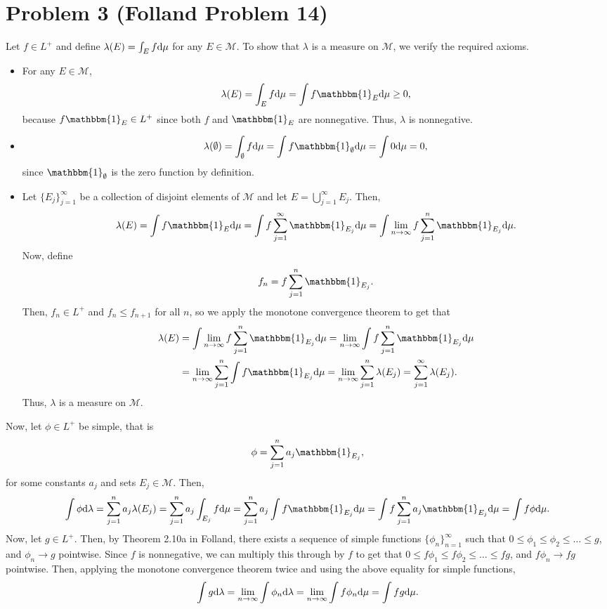 \documentclass{article}
\begin{document}
\section{Problem 3 (Folland Problem 14)}
Let $f\in L^+$ and define $\lambda(E)=\int_Ef\mathrm{d}\mu$ for any $E\in\mathcal M$. To show that $\lambda$ is a measure on $\mathcal M$, we verify the required axioms. 
\begin{itemize}
	\item For any $E\in\mathcal M$, 
	\[
	\lambda(E)=\int_Ef\df\mu=\int f\mathbbm{1}_E\df\mu\geq0,
	\]
	because $f\mathbbm{1}_E\in L^+$ since both $f$ and $\mathbbm{1}_E$ are nonnegative. Thus, $\lambda$ is nonnegative.
	\item 
	\[
	\lambda(\emptyset)=\int_\emptyset f\df\mu=\int f\mathbbm{1}_\emptyset\df\mu=\int0\df\mu=0,
	\]
	since $\mathbbm{1}_\emptyset$ is the zero function by definition.
	\item Let $\{E_j\}_{j=1}^\infty$ be a collection of disjoint elements of $\mathcal M$ and let $E=\bigcup_{j=1}^\infty E_j$. Then,
	\[
	\lambda(E)=\int f\mathbbm{1}_E\df\mu=\int f\sum_{j=1}^{\infty}\mathbbm{1}_{E_j}\df\mu=\int\lim_{n\to\infty} f\sum_{j=1}^{n}\mathbbm{1}_{E_j}\df\mu.
	\]
	Now, define 
	\[
	f_n=f\sum_{j=1}^{n}\mathbbm{1}_{E_j}.
	\]
	Then, $f_n\in L^+$ and $f_n\leq f_{n+1}$ for all $n$, so we apply the monotone convergence theorem to get that
	\begin{align*}
	\lambda(E)&=\int\lim_{n\to\infty} f\sum_{j=1}^{n}\mathbbm{1}_{E_j}\df\mu=\lim_{n\to\infty}\int f\sum_{j=1}^{n}\mathbbm{1}_{E_j}\df\mu\\&=
	\lim_{n\to\infty}\sum_{j=1}^{n}\int f\mathbbm{1}_{E_j}\df\mu=\lim_{n\to\infty}\sum_{j=1}^{n}\lambda(E_j)=\sum_{j=1}^{\infty}\lambda(E_j).
	\end{align*}
	Thus, $\lambda$ is a measure on $\mathcal M$.
\end{itemize}
	Now, let $\phi\in L^+$ be simple, that is
\[
\phi=\sum_{j=1}^na_j\mathbbm{1}_{E_j},
\] 
for some constants $a_j$ and sets $E_j\in\mathcal M$. Then,
\[
\int \phi\df\lambda=\sum_{j=1}^{n}a_j\lambda(E_j)=\sum_{j=1}^{n}a_j\int_{E_j}f\df\mu=\sum_{j=1}^{n}a_j\int f\mathbbm{1}_{E_j}\df\mu=\int f\sum_{j=1}^na_j\mathbbm{1}_{E_j}\df\mu=\int f\phi\df\mu.
\]
Now, let $g\in L^+$. Then, by Theorem 2.10a in Folland, there exists a sequence of simple functions $\{\phi_n\}_{n=1}^\infty$ such that $0\leq\phi_1\leq\phi_2\leq\ldots\leq g$, and $\phi_n\to g$ pointwise. Since $f$ is nonnegative, we can multiply this through by $f$ to get that $0\leq f\phi_1\leq f\phi_2\leq\ldots\leq fg$, and $f\phi_n\to fg$ pointwise. Then, applying the monotone convergence theorem twice and using the above equality for simple functions,
\[
\int g\mathrm{d}\lambda=\lim_{n\to\infty}\int\phi_n\mathrm{d}\lambda=\lim_{n\to\infty}\int f\phi_n\mathrm{d}\mu=\int fg\mathrm{d}\mu.
\]
\end{document}
